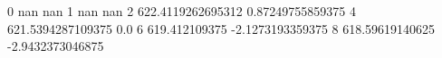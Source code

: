 0 nan nan
1 nan nan
2 622.4119262695312 0.87249755859375
4 621.5394287109375 0.0
6 619.412109375 -2.1273193359375
8 618.59619140625 -2.9432373046875
